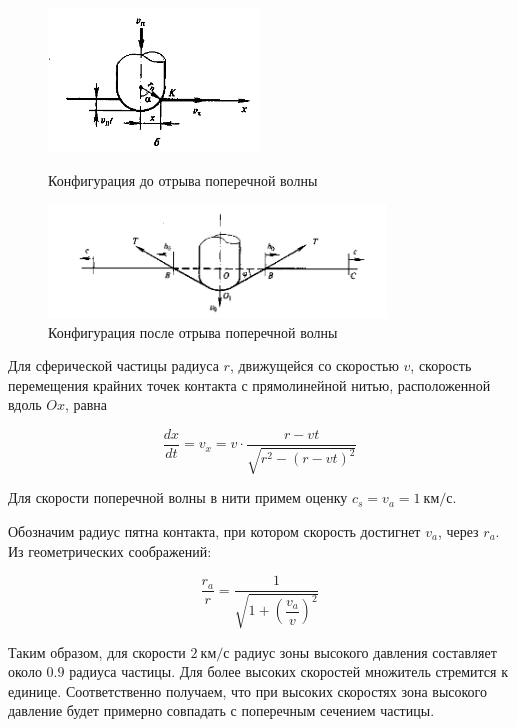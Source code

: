 \begin{figure}[H]
    \centering

    \label{fig:first-stage}
    \includegraphics[width=0.5\textwidth]{img/first_stage.png}
    \caption{Конфигурация до отрыва поперечной волны}

    \label{fig:second-stage}
    \includegraphics[width=0.8\textwidth]{img/second_stage.png}
    \caption{Конфигурация после отрыва поперечной волны}
\end{figure}

Для сферической частицы радиуса $r$, движущейся со скоростью $v$, скорость перемещения крайних точек контакта с
прямолинейной нитью, расположенной вдоль $Ox$, равна

\begin{equation}
    \frac{dx}{dt} = v_x = v \cdot \frac{r - v t}{\sqrt{r^2 - (r - v t)^2}}
\end{equation}

Для скорости поперечной волны в нити примем оценку $c_s = v_a = 1~км/с$.

Обозначим радиус пятна контакта, при котором скорость достигнет $v_a$, через $r_a$.
Из геометрических соображений:

\begin{equation}
    \dfrac{r_a}{r} = \dfrac{1}{\sqrt{1 + (\dfrac{v_a}{v})^2}}
\end{equation}

Таким образом, для скорости $2~км/с$ радиус зоны высокого давления составляет около $0.9$ радиуса частицы.
Для более высоких скоростей множитель стремится к единице.
Соответственно получаем, что при высоких скоростях зона высокого давление будет примерно совпадать с поперечным сечением частицы.

